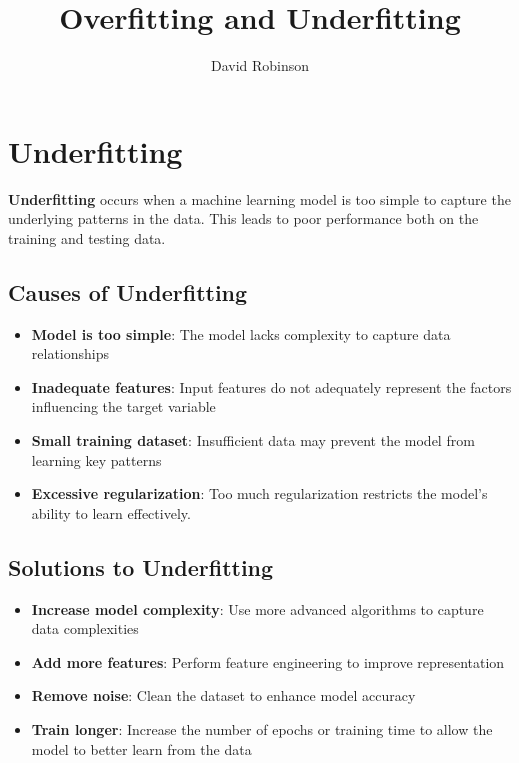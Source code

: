 \documentclass{article}
\title{Overfitting and Underfitting}
\author{David Robinson}
\date{}
\begin{document}
\maketitle

\section*{Underfitting}

\textbf{Underfitting} occurs when a machine learning model is too simple to capture the underlying patterns in the data. This leads to poor performance both on the training and testing data.

\subsection*{Causes of Underfitting}

\begin{itemize}
    \item \textbf{Model is too simple}: The model lacks complexity to capture data relationships
    \item \textbf{Inadequate features}: Input features do not adequately represent the factors influencing the target variable
    \item \textbf{Small training dataset}: Insufficient data may prevent the model from learning key patterns
    \item \textbf{Excessive regularization}: Too much regularization restricts the model's ability to learn effectively.
\end{itemize}

\subsection*{Solutions to Underfitting}

\begin{itemize}
    \item \textbf{Increase model complexity}: Use more advanced algorithms to capture data complexities
    \item \textbf{Add more features}: Perform feature engineering to improve representation
    \item \textbf{Remove noise}: Clean the dataset to enhance model accuracy
    \item \textbf{Train longer}: Increase the number of epochs or training time to allow the model to better learn from the data
\end{itemize}
\end{document}
